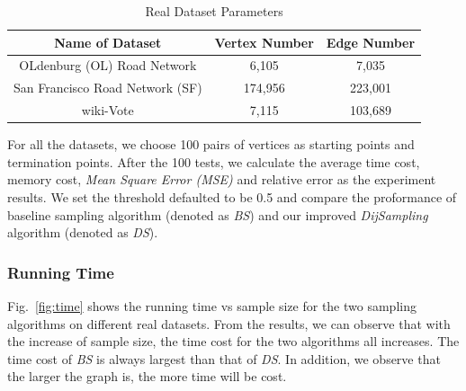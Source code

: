\documentclass[runningheads,a4paper]{llncs}
\begin{document}
\begin{table}[htbp]
\vspace{-0.2cm}
  \centering
  \caption{\small{Real Dataset Parameters}}
\vspace{-0.1cm}
  \label{tab:Rdataset}
  \begin{tabular}{|c|c|c|}
    \hline
    \bfseries {Name of Dataset} & \bfseries {Vertex Number} & \bfseries {Edge Number} \\
    \hline
    OLdenburg (OL) Road Network & 6,105 & 7,035 \\
    \hline
    San Francisco Road Network (SF) & 174,956 & 223,001 \\
    \hline
    wiki-Vote & 7,115 & 103,689 \\
    \hline
    \end{tabular}
\vspace{-0.4cm}
\end{table}

For all the datasets, we choose 100 pairs of vertices as starting points and termination points. After the 100 tests, we calculate the average time cost, memory cost, \emph{Mean Square Error (MSE)} and relative error as the experiment results. We set the threshold defaulted to be 0.5 and compare the proformance of baseline sampling algorithm (denoted as \emph{BS}) and our improved \emph{DijSampling} algorithm (denoted as \emph{DS}).

\vspace{-0.2cm}

\subsubsection{Running Time}
\label{sec:exp:alg:time}

Fig.~\ref{fig:time} shows the running time vs sample size for the two sampling algorithms on different real datasets. From the results, we can observe that with the increase of sample size, the time cost for the two algorithms all increases. The time cost of \emph{BS} is always largest than that of \emph{DS}. In addition, we observe that the larger the graph is, the more time will be cost.
\end{document}
